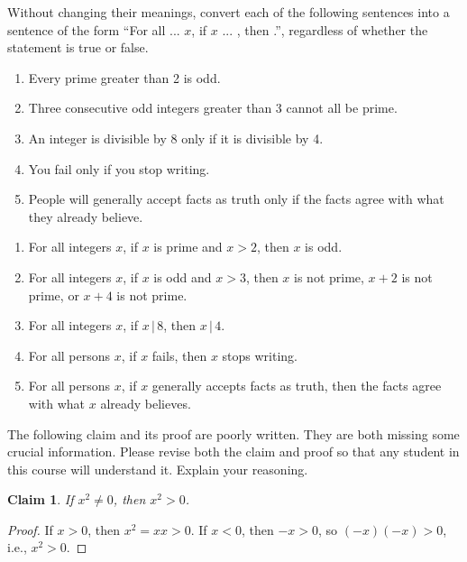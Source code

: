 \documentclass{article}
\newtheorem*{claim}{Claim}
\theoremstyle{definition}
\begin{document}
\begin{question}
   Without changing their meanings, convert each of the following sentences into a sentence of the form ``For all ... $x$, if $x$ ... , then .'', regardless of whether the statement is true or false.
    \begin{enumerate}
        \item Every prime greater than 2 is odd.
        \item Three consecutive odd integers greater than 3 cannot all be prime.
        \item An integer is divisible by 8 only if it is divisible by 4.
        \item You fail only if you stop writing.
        \item People will generally accept facts as truth only if the facts agree with what they already believe.
    \end{enumerate}
\end{question}
\begin{solution}
\begin{enumerate}
    \item For all integers $x$, if $x$ is prime and $x>2$, then $x$ is odd.
    \item For all integers $x$, if $x$ is odd and $x>3$, then $x$ is not prime, $x+2$ is not prime, or $x+4$ is not prime.
    \item For all integers $x$, if $x\,|\,8$, then $x\,|\,4$.
    \item For all persons $x$, if $x$ fails, then $x$ stops writing.
    \item For all persons $x$, if $x$ generally accepts facts as truth, then the facts agree with what $x$ already believes.
\end{enumerate}
\end{solution}
\begin{question}
   The following claim and its proof are poorly written. They are both missing some crucial information. 
   Please revise both the claim and proof so that any student in this course will understand it. Explain your reasoning.
      \begin{claim}
       If $x^2\neq 0$, then $x^2>0$.
      \end{claim}\begin{proof}
       If $x>0$, then $x^2=xx>0$. If $x<0$, then $-x>0$, so $(-x)(-x)>0$, i.e., $x^2>0$.
      \end{proof}
\end{question}
\end{document}
